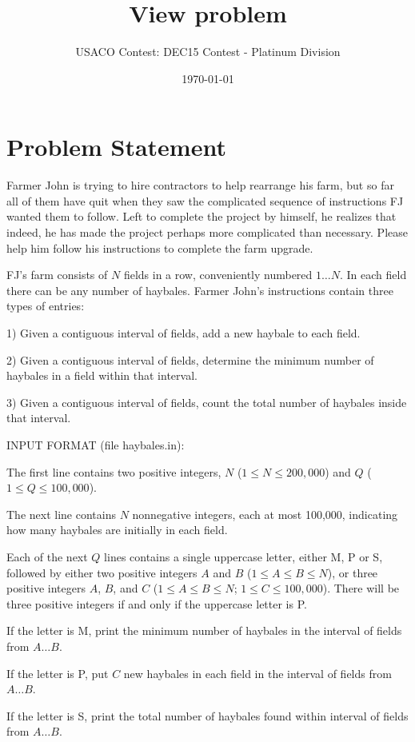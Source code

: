 \documentclass[12pt]{article}
\title{View problem}
\author{USACO Contest: DEC15 Contest - Platinum Division}
\date{\today}
\begin{document}
\maketitle

\section*{Problem Statement}

Farmer John is trying to hire contractors to help rearrange his farm, but so far
all of them have quit when they saw the complicated sequence of instructions FJ
wanted them to follow.  Left to complete the project by himself, he realizes
that indeed, he has made the project perhaps more  complicated than necessary. 
Please help him follow his instructions to  complete the farm upgrade.

FJ's farm consists of $N$ fields in a row, conveniently numbered $1 \ldots N$.
In each field there can be any number of haybales.  Farmer John's instructions
contain three types of entries:

1) Given a contiguous interval of fields, add a new haybale to each field.

2) Given a contiguous interval of fields, determine the minimum number of
haybales in a field within that interval.

3) Given a contiguous interval of fields, count the total number of haybales 
inside that interval.

INPUT FORMAT (file haybales.in):

The first line contains two positive integers, $N$ ($1 \leq N \leq 200,000$) and
$Q$ ($1 \leq Q \leq 100,000$). 

The next line contains $N$ nonnegative integers, each at most 100,000,
indicating how many haybales are initially in each field.

Each of the next $Q$ lines contains a single uppercase letter, either M, P or S,
followed by either two positive integers $A$ and $B$ ($1 \leq A \leq B \leq N$),
or three positive integers $A$, $B$, and $C$ ($1 \leq A \leq B \leq N$;
$1 \leq C \leq 100,000$).  There will be three positive integers if and only if
the uppercase letter is P.

If the letter is M, print the minimum number of haybales in the interval of fields
from $A \ldots B$.

If the letter is P, put $C$ new haybales in each field in the interval of fields
from $A \ldots B$.

If the letter is S, print the total number of haybales found within interval of
fields from $A \ldots B$. 
\end{document}
